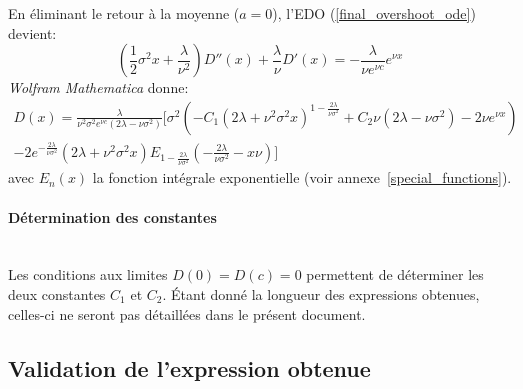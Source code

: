 En éliminant le retour à la moyenne ($a=0$), l'\acs{EDO} (\ref{final_overshoot_ode}) devient:
\begin{equation}\label{particular_overshoot_ode}
    \left(\frac{1}{2}\sigma^2x+\frac{\lambda}{\nu^2}\right)D''(x)+\frac{\lambda}{\nu}D'(x) =-\frac{\lambda}{\nu e^{\nu c}}e^{\nu x}
\end{equation}
\textit{Wolfram Mathematica} donne:
\begin{equation}\label{sol_overshoot}
    \begin{aligned}
            D(x)=\frac{\lambda}{{\nu^2\sigma^2e^{\nu c}(2\lambda-\nu\sigma^2)}}\Bigg[\sigma^2\left(-C_1 \left(2 \lambda +\nu ^2 \sigma ^2 x\right)^{1-\frac{2 \lambda }{\nu  \sigma ^2}}+C_2 \nu  \left(2 \lambda -\nu  \sigma ^2\right)-2 \nu  e^{\nu  x}\right) \\-2 e^{-\frac{2 \lambda }{\nu  \sigma ^2}} \left(2 \lambda +\nu ^2 \sigma ^2 x\right) E_{1-\frac{2 \lambda }{\nu  \sigma ^2}}\left(-\frac{2 \lambda }{\nu  \sigma ^2}-x \nu \right)\Bigg]
    \end{aligned}
\end{equation}
avec $E_n(x)$ la fonction intégrale exponentielle (voir annexe~\ref{special_functions}).

\paragraph{Détermination des constantes}\phantom{}\\
Les conditions aux limites $D(0)=D(c)=0$ permettent de déterminer les deux constantes $C_1$ et $C_2$. Étant donné la longueur des expressions obtenues, celles-ci ne seront pas détaillées dans le présent document.

\subsection{Validation de l'expression obtenue}
